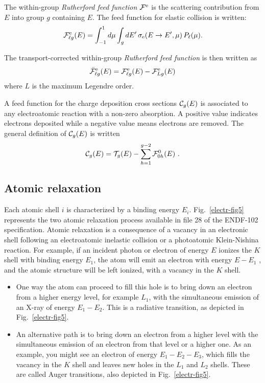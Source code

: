 \noindent The within-group {\sl Rutherford feed function} ${\cal F}^{\rm e}$ is
the scattering contribution from $E$ into group $g$ containing $E$. The feed
function for elastic collision is written:
  \begin{equation}
    {\cal F}^{\rm e}_{\ell g}(E) = \int_{-1}^1 d\mu \int_{g} dE'
    \, \sigma_{\rm e}(E\rightarrow E',\mu)\,P_\ell(\mu) .
  \label{elr_eq22}
  \end{equation}

The transport-corrected within-group {\sl Rutherford feed function} is then
written as
  \begin{equation}
    \bar{\cal F}^{\rm e}_{\ell g}(E) = {\cal F}^{\rm e}_{\ell g}(E)-
    {\cal F}^{\rm e}_{L g}(E)
  \label{elr_eq23}
  \end{equation}
\noindent where $L$ is the maximum Legendre order.

A feed function for the charge deposition cross sections ${\cal C}_g(E)$
is associated to any electroatomic reaction with a non-zero absorption. A
positive value indicates electrons deposited while a negative value means
electrons are removed. The general definition of ${\cal C}_g(E)$ is written
  \begin{equation}
    {\cal C}_g(E) ={\cal T}_g(E)-\sum_{h=1}^{g-2} {\cal F}^0_{0 h}(E) \ .
  \label{elr_eq24}
  \end{equation}

\subsection{Atomic relaxation}
\label{ssELECTR_Relaxation}

Each atomic shell $i$ is characterized by a binding energy $E_i$.
Fig.~\ref{electr-fig5} represents the two atomic relaxation process available
in file 28 of the ENDF-102 specification. Atomic relaxation is a consequence
of a vacancy in an electronic shell following an electroatomic inelastic
collision or a photoatomic Klein-Nishina reaction. For example, if an incident
photon or electron of energy $E$ ionizes the $K$ shell with binding energy
$E_1$, the atom will emit an electron with energy $E - E_1$ , and the atomic
structure will be left ionized, with a vacancy in the $K$ shell.
\begin{itemize}
\item One way the atom can proceed to fill this hole is to bring down an
electron from a higher energy level, for example $L_1$, with the simultaneous
emission of an X-ray of energy $E_1 - E_2$. This is a radiative transition,
as depicted in Fig.~\ref{electr-fig5}.
\item An alternative path is to bring down an electron from a higher level
with the simultaneous emission of an electron from that level or a higher one.
As an example, you might see an electron of energy $E_1 -E_2 -E_3$,
which fills the vacancy in the $K$ shell and leaves new holes in the $L_1$ and
$L_2$ shells. These are called Auger transitions, also depicted in
Fig.~\ref{electr-fig5}.
\end{itemize}

